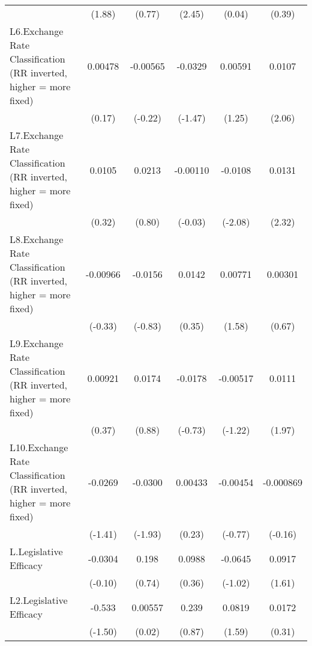 {\begin{longtable}{l*{5}{c}}
                &   (1.88)         &   (0.77)         &   (2.45)         &   (0.04)         &   (0.39)         \\
\addlinespace
L6.Exchange Rate Classification (RR inverted, higher = more fixed)&  0.00478         & -0.00565         &  -0.0329         &  0.00591         &   0.0107\sym{*}  \\
                &   (0.17)         &  (-0.22)         &  (-1.47)         &   (1.25)         &   (2.06)         \\
\addlinespace
L7.Exchange Rate Classification (RR inverted, higher = more fixed)&   0.0105         &   0.0213         & -0.00110         &  -0.0108\sym{*}  &   0.0131\sym{*}  \\
                &   (0.32)         &   (0.80)         &  (-0.03)         &  (-2.08)         &   (2.32)         \\
\addlinespace
L8.Exchange Rate Classification (RR inverted, higher = more fixed)& -0.00966         &  -0.0156         &   0.0142         &  0.00771         &  0.00301         \\
                &  (-0.33)         &  (-0.83)         &   (0.35)         &   (1.58)         &   (0.67)         \\
\addlinespace
L9.Exchange Rate Classification (RR inverted, higher = more fixed)&  0.00921         &   0.0174         &  -0.0178         & -0.00517         &   0.0111         \\
                &   (0.37)         &   (0.88)         &  (-0.73)         &  (-1.22)         &   (1.97)         \\
\addlinespace
L10.Exchange Rate Classification (RR inverted, higher = more fixed)&  -0.0269         &  -0.0300         &  0.00433         & -0.00454         &-0.000869         \\
                &  (-1.41)         &  (-1.93)         &   (0.23)         &  (-0.77)         &  (-0.16)         \\
\addlinespace
L.Legislative Efficacy&  -0.0304         &    0.198         &   0.0988         &  -0.0645         &   0.0917         \\
                &  (-0.10)         &   (0.74)         &   (0.36)         &  (-1.02)         &   (1.61)         \\
\addlinespace
L2.Legislative Efficacy&   -0.533         &  0.00557         &    0.239         &   0.0819         &   0.0172         \\
                &  (-1.50)         &   (0.02)         &   (0.87)         &   (1.59)         &   (0.31)         \\

\end{longtable}}
